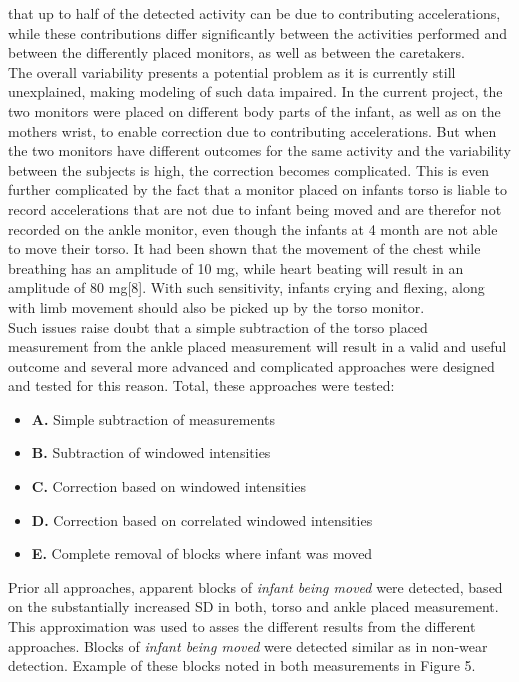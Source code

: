 \documentclass{article}
\begin{document}
{that up to half of the detected activity can be due to contributing accelerations, while these contributions differ significantly between the activities performed and between the differently placed monitors, as well as between the caretakers.\\
The overall variability presents a potential problem as it is currently still unexplained, making modeling of such data impaired. In the current project, the two monitors were placed on different body parts of the infant, as well as on the mothers wrist, to enable correction due to contributing accelerations. But when the two monitors have different outcomes for the same activity and the variability between the subjects is high, the correction becomes complicated. This is even further complicated by the fact that a monitor placed on infants torso is liable to record accelerations that are not due to infant being moved and are therefor not recorded on the ankle monitor, even though the infants at 4 month are not able to move their torso. It had been shown that the movement of the chest while breathing has an amplitude of 10 mg, while heart beating will result in an amplitude of 80 mg[8]. With such sensitivity, infants crying and flexing, along with limb movement should also be picked up by the torso monitor.\\ Such issues raise doubt that a simple subtraction of the torso placed measurement from the ankle placed measurement will result in a valid and useful outcome and several more advanced and complicated approaches were designed and tested for this reason. Total, these approaches were tested:
\begin{itemize}
\item \textbf{A.} Simple subtraction of measurements
\item \textbf{B.} Subtraction of windowed intensities
\item \textbf{C.} Correction based on windowed intensities
\item \textbf{D.} Correction based on correlated windowed intensities
\item \textbf{E.} Complete removal of blocks where infant was moved
\end{itemize}
Prior all approaches, apparent blocks of \textit{infant being moved} were detected, based on the substantially increased SD in both, torso and ankle placed measurement. This approximation was used to asses the different results from the different approaches. Blocks of \textit{infant being moved} were detected similar as in non-wear detection. Example of these blocks noted in both measurements in Figure 5.
}
\end{document}
